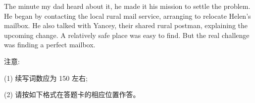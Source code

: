 \documentclass{英语试卷}
\begin{document}
\par The minute my dad heard about it, he made it his mission to settle the problem. He began by contacting the local rural mail service, arranging to relocate Helen's mailbox. He also talked with Yancey, their shared rural postman, explaining the upcoming change. A relatively safe place was easy to find. But the real challenge was finding a perfect mailbox.\par
\par 注意:\par
\par (1) 续写词数应为 150 左右;\par
\par (2) 请按如下格式在答题卡的相应位置作答。\par
{}
\end{document}

